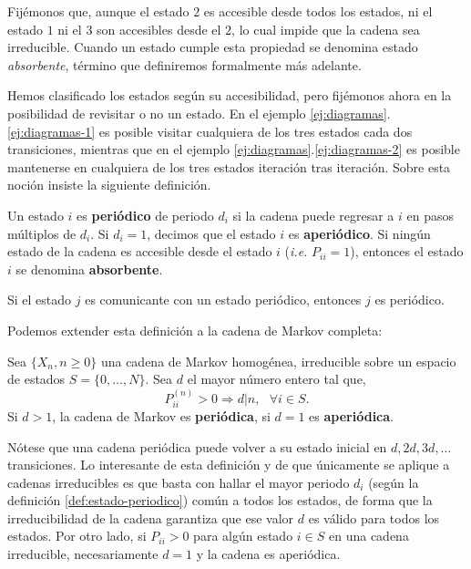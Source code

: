 \begin{ejemplo}
\begin{enumerate}
        Fijémonos que, aunque el estado $2$ es accesible desde todos los estados, ni el estado $1$ ni el $3$ son accesibles desde el $2$, lo cual impide que la cadena sea irreducible. Cuando un estado cumple esta propiedad se denomina estado \textit{absorbente}, término que definiremos formalmente más adelante.
    \end{enumerate}
    \label{ej:diagramas}
\end{ejemplo}

Hemos clasificado los estados según su accesibilidad, pero fijémonos ahora en la posibilidad de revisitar o no un estado. En el ejemplo \ref{ej:diagramas}.\ref{ej:diagramas-1} es posible visitar cualquiera de los tres estados cada dos transiciones, mientras que en el ejemplo \ref{ej:diagramas}.\ref{ej:diagramas-2} es posible mantenerse en cualquiera de los tres estados iteración tras iteración. Sobre esta noción insiste la siguiente definición.

\begin{definicion}
    \label{def:estado-periodico}
    Un estado $i$ es \textbf{periódico} de periodo $d_i$ si la cadena puede regresar a $i$ en pasos múltiplos de $d_i$. Si $d_i=1$, decimos que el estado $i$ es \textbf{aperiódico}. Si ningún estado de la cadena es accesible desde el estado $i$ (\textit{i.e.} $P_{ii}=1$), entonces el estado $i$ se denomina \textbf{absorbente}.
\end{definicion}

\begin{observacion}
    Si el estado $j$ es comunicante con un estado periódico, entonces $j$ es periódico.
\end{observacion}

Podemos extender esta definición a la cadena de Markov completa:

\begin{definicion}
    Sea $\{X_n,n\geq 0\}$ una cadena de Markov homogénea, irreducible sobre un espacio de estados $S=\{0,\dots,N\}$. Sea $d$ el mayor número entero tal que, 
    \begin{equation}
        \label{eq:cond-periodica}
        P_{ii}^{(n)}>0 \Rightarrow d|n, \ \ \ \forall i\in S.
    \end{equation}
    Si $d>1$, la cadena de Markov es \textbf{periódica}, si $d=1$ es \textbf{aperiódica}.
\end{definicion}
Nótese que una cadena periódica puede volver a su estado inicial en $d,2d,3d,\dots$ transiciones. Lo interesante de esta definición y de que únicamente se aplique a cadenas irreducibles es que basta con hallar el mayor periodo $d_i$ (según la definición \ref{def:estado-periodico}) común a todos los estados, de forma que la irreducibilidad de la cadena garantiza que ese valor $d$ es válido para todos los estados. Por otro lado, si $P_{ii}>0$ para algún estado $i\in S$ en una cadena irreducible, necesariamente $d=1$ y la cadena es aperiódica.

